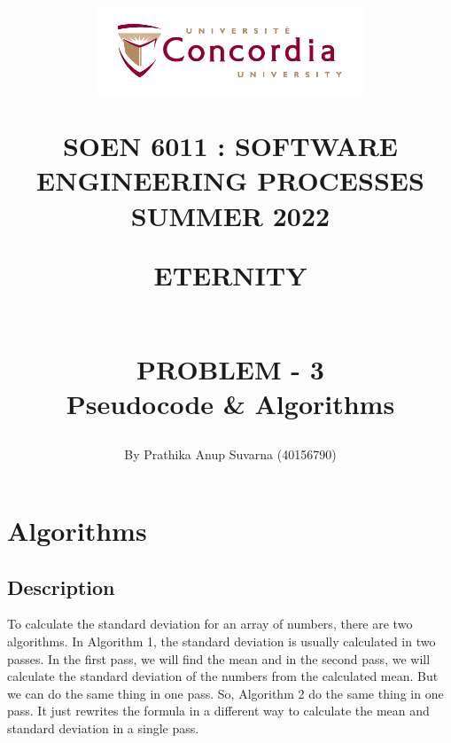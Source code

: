 \documentclass[11pt]{report}
\begin{document}
\title{\begin{figure}[htb]
\begin{center}
\includegraphics[width=8cm]{univ_logo}
\end{center}
\end{figure}SOEN 6011 : SOFTWARE ENGINEERING PROCESSES\\[.5em]
SUMMER 2022\\\vspace*{0.9in}
\begin{Large}
\textbf{ETERNITY} 
\end{Large}
\vspace*{0.9in}
\begin{Large}
\textbf{\\PROBLEM - 3} 
\\Pseudocode \& Algorithms\\
\end{Large}}
\author{By Prathika Anup Suvarna (40156790)}
\maketitle 
{}
\setcounter{page}{0}

\tableofcontents
\pagebreak

\renewcommand{\thesection}{\arabic{section}}


\section{\Large \vspace{0.2 cm}Algorithms}

\subsection{\Large \vspace{0.2 cm}Description}
To calculate the standard deviation for an array of numbers, there are two algorithms. In Algorithm 1, the standard deviation is usually calculated in two passes. In the first pass, we will find the mean and in the second pass, we will calculate the standard deviation of the numbers from the calculated mean. 
But we can do the same thing in one pass. So, Algorithm 2 do the same thing in one pass. It just rewrites the formula in a different way to calculate the mean and standard deviation in a single pass.
\end{document}
